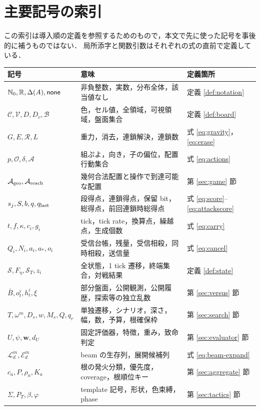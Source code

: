 \appendix
\section{主要記号の索引}\label{sec:notation-index}
この索引は導入順の定義を参照するためのもので，本文で先に使った記号を事後的に補うものではない．
局所添字と関数引数はそれぞれの式の直前で定義している．
\begin{longtable}{p{.25\linewidth}p{.43\linewidth}p{.22\linewidth}}
\toprule 記号 & 意味 & 定義箇所\\\midrule\endhead
$\mathbb{N}_0,\mathbb{R},\Delta(A),\mathsf{none}$ & 非負整数，実数，分布全体，該当値なし & 定義 \ref{def:notation}\\
$\mathcal C,\mathcal V,D,D_v,\mathcal B$ & 色，セル値，全領域，可視領域，盤面集合 & 定義 \ref{def:board}\\
$G,E,\mathcal R,L$ & 重力，消去，連鎖解決，連鎖数 & 式 \eqref{eq:gravity}，\eqref{eq:erase}\\
$p,\mathcal O,\delta,\mathcal A$ & 組ぷよ，向き，子の偏位，配置行動集合 & 式 \eqref{eq:actions}\\
$\mathcal A_{\rm geo},\mathcal A_{\rm reach}$ & 幾何合法配置と操作で到達可能な配置 & 第 \ref{sec:game} 節\\
$s_j,S,b,q,q_{\rm last}$ & 段得点，連鎖得点，保留 bit，総得点，前回連鎖時総得点 & 式 \eqref{eq:score}--\eqref{eq:attackscore}\\
$t,f,\kappa,c_i,g_i$ & tick，tick rate，換算点，繰越点，生成個数 & 式 \eqref{eq:carry}\\
$Q_i,N_i,a_i,a_*,o_i$ & 受信台帳，残量，受信相殺，同時相殺，送信量 & 式 \eqref{eq:cancel}\\
$\mathcal S,F_\eta,\mathcal S_T,z_i$ & 全状態，1 tick 遷移，終端集合，対戦結果 & 定義 \ref{def:state}\\
$\bar B,o_t^i,h_t^i,\xi$ & 部分盤面，公開観測，公開履歴，探索等の独立乱数 & 第 \ref{sec:versus} 節\\
$T,\omega^m,D_s,w,M_s,Q,q_r$ & 単独遷移，シナリオ，深さ，幅，数，予算，根確保枠 & 第 \ref{sec:search} 節\\
$U,\psi,\mathbf w,d_U$ & 固定評価器，特徴，重み，致命判定 & 第 \ref{sec:evaluator} 節\\
$\mathcal L_d^m,\mathcal E_d^m$ & beam の生存列，展開候補列 & 式 \eqref{eq:beam-expand}\\
$c_a,P,\rho_a,K_a$ & 根の発火分類，優先度，coverage，根順位キー & 第 \ref{sec:aggregate} 節\\
$\Sigma,P_T,\beta,\varphi$ & template 記号，形状，色束縛，phase & 第 \ref{sec:tactics} 節\\

\end{longtable}
